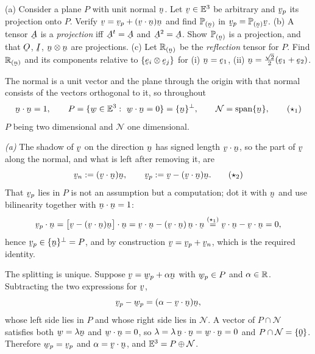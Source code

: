 \begin{problem}
\textup{(a)} Consider a plane $P$ with unit normal $\bn$. Let $\bv\in\Et$ be
arbitrary and $\bv_p$ its projection onto $P$. Verify
$\bv=\bv_p+(\ip\bv\bn)\bn$ and find $\Proj{\bn}$ in
$\bv_p=\Proj{\bn}\bv$.
\textup{(b)} A tensor $\bA$ is a \emph{projection} iff $\bA^{t}=\bA$ and
$\bA^{2}=\bA$. Show $\Proj{\bn}$ is a projection, and that
$\Ob$, $\I$, $\bn\otimes\bn$ are projections.
\textup{(c)} Let $\Refl{\bn}$ be the \emph{reflection} tensor for $P$. Find
$\Refl{\bn}$ and its components relative to $\{\be_i\otimes\be_j\}$ for
\textup{(i)} $\bn=\be_1$, \textup{(ii)}
$\bn=\tfrac{\sqrt2}{2}(\be_1+\be_2)$.
\end{problem}

\begin{solution}
The normal is a unit vector and the plane through the origin with that
normal consists of the vectors orthogonal to it, so throughout
\begin{equation}
   \ip\bn\bn=1,\qquad
   P=\{\bw\in\Et:\ \ip\bw\bn=0\}=\{\bn\}^{\perp},\qquad
   \mathcal{N}=\operatorname{span}\{\bn\}, \tag{$\star_1$}
\end{equation}
$P$ being two dimensional and $\mathcal{N}$ one dimensional.

\emph{(a)} The shadow of $\bv$ on the direction $\bn$ has signed length
$\ip\bv\bn$, so the part of $\bv$ along the normal, and what is left after
removing it, are
\begin{equation}
   \bv_n:=(\ip\bv\bn)\bn,\qquad \bv_p:=\bv-(\ip\bv\bn)\bn . \tag{$\star_2$}
\end{equation}
That $\bv_p$ lies in $P$ is not an assumption but a computation; dot it with
$\bn$ and use bilinearity together with $\ip\bn\bn=1$:
\[
   \ip{\bv_p}{\bn}=\ip{\big[\bv-(\ip\bv\bn)\bn\big]}{\bn}
   =\ip\bv\bn-(\ip\bv\bn)\,\ip\bn\bn
   \overset{(\star_1)}{=}\ip\bv\bn-\ip\bv\bn=0 ,
\]
hence $\bv_p\in\{\bn\}^{\perp}=P$, and by construction $\bv=\bv_p+\bv_n$,
which is the required identity.

The splitting is unique. Suppose $\bv=\bw_p+\alpha\bn$ with $\bw_p\in P$ and
$\alpha\in\mathbb{R}$. Subtracting the two expressions for $\bv$,
\[
   \bv_p-\bw_p=(\alpha-\ip\bv\bn)\bn ,
\]
whose left side lies in $P$ and whose right side lies in $\mathcal{N}$. A
vector of $P\cap\mathcal{N}$ satisfies both $\bw=\lambda\bn$ and
$\ip\bw\bn=0$, so $\lambda=\lambda\,\ip\bn\bn=\ip\bw\bn=0$ and
$P\cap\mathcal{N}=\{\bze\}$. Therefore $\bw_p=\bv_p$ and
$\alpha=\ip\bv\bn$, and $\mathbb{E}^{3}=P\oplus\mathcal{N}$.


\end{solution}

